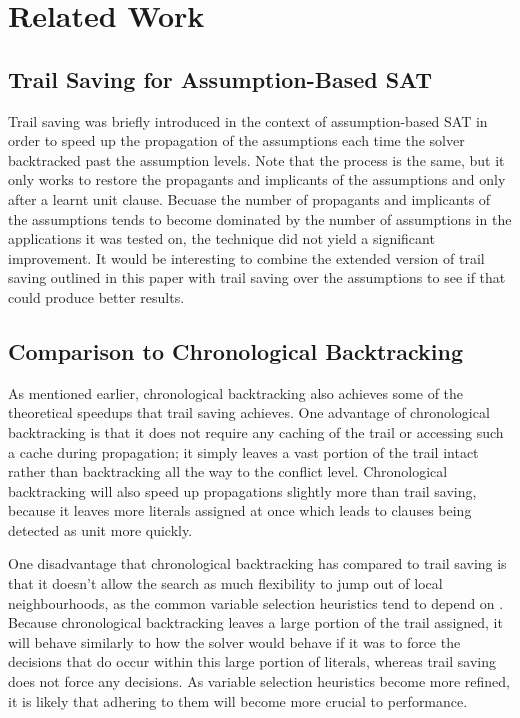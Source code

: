 \documentclass{article}
\begin{document}
\section{Related Work}
\subsection{Trail Saving for Assumption-Based SAT}
Trail saving was briefly introduced in the context of assumption-based SAT \cite{DBLP:conf/sat/HickeyB19} in order to speed up the propagation of the assumptions each time the solver backtracked past the assumption levels. Note that the process is the same, but it only works to restore the propagants and implicants of the assumptions and only after a learnt unit clause. Becuase the number of propagants and implicants of the assumptions tends to become dominated by the number of assumptions in the applications it was tested on, the technique did not yield a significant improvement. It would be interesting to combine the extended version of trail saving outlined in this paper with trail saving over the assumptions to see if that could produce better results. 

\subsection{Comparison to Chronological Backtracking}
As mentioned earlier, chronological backtracking also achieves some of the theoretical speedups that trail saving achieves. One advantage of chronological backtracking is that it does not require any caching of the trail or accessing such a cache during propagation; it simply leaves a vast portion of the trail intact rather than backtracking all the way to the conflict level. Chronological backtracking will also speed up propagations slightly more than trail saving, because it leaves more literals assigned at once which leads to clauses being detected as unit more quickly.

One disadvantage that chronological backtracking has compared to trail saving is that it doesn't allow the search as much flexibility to jump out of local neighbourhoods, as the common variable selection heuristics tend to depend on \cite{DBLP:conf/dac/MoskewiczMZZM01, DBLP:conf/sat/2015, DBLP:conf/sat/LiangGPC16}. Because chronological backtracking leaves a large portion of the trail assigned, it will behave similarly to how the solver would behave if it was to force the decisions that do occur within this large portion of literals, whereas trail saving does not force any decisions. As variable selection heuristics become more refined, it is likely that adhering to them will become more crucial to performance.
\end{document}
